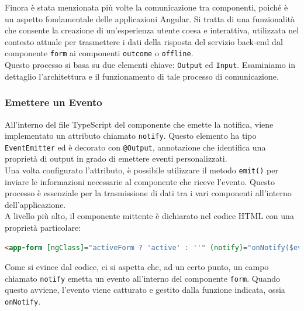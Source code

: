 Finora è stata menzionata più volte la comunicazione tra componenti, poiché è un aspetto fondamentale delle applicazioni Angular. Si tratta di una funzionalità che consente la creazione di un'esperienza utente coesa e interattiva, utilizzata nel contesto attuale per trasmettere i dati della risposta del servizio back-end dal componente \texttt{form} ai componenti \texttt{outcome} o \texttt{offline}.\\
Questo processo si basa su due elementi chiave: \texttt{Output} ed \texttt{Input}. Esaminiamo in dettaglio l'architettura e il funzionamento di tale processo di comunicazione.

\subsubsection{Emettere un Evento}
All’interno del file TypeScript del componente che emette la notifica, viene implementato un attributo chiamato \texttt{notify}. Questo elemento ha tipo \texttt{EventEmitter} ed è decorato con \texttt{@Output}, annotazione che identifica una proprietà di output in grado di emettere eventi personalizzati.\\
Una volta configurato l’attributo, è possibile utilizzare il metodo \texttt{emit()} per inviare le informazioni necessarie al componente che riceve l’evento. Questo processo è essenziale per la trasmissione di dati tra i vari componenti all’interno dell’applicazione.\\
A livello più alto, il componente mittente è dichiarato nel codice HTML con una proprietà particolare:
\begin{lstlisting}[language=HTML, caption=Dichiarazione di un componente in grado di notificare eventi.]
<app-form [ngClass]="activeForm ? 'active' : ''" (notify)="onNotify($event)"></app-form>
\end{lstlisting}
Come si evince dal codice, ci si aspetta che, ad un certo punto, un campo chiamato \texttt{notify} emetta un evento all’interno del componente \texttt{form}. Quando questo avviene, l’evento viene catturato e gestito dalla funzione indicata, ossia \texttt{onNotify}.

